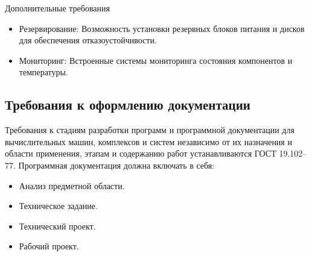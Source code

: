 Дополнительные требования
\begin{itemize}
	\item Резервирование: Возможность установки резервных блоков питания и дисков для обеспечения отказоустойчивости.
	\item Мониторинг: Встроенные системы мониторинга состояния компонентов и температуры.
\end{itemize}

\subsection{Требования к оформлению документации}
Требования к стадиям разработки программ и программной документации для вычислительных машин, комплексов и систем независимо от их
назначения и области применения, этапам и содержанию работ устанавливаются ГОСТ 19.102–77.
Программная документация должна включать в себя:
\begin{itemize}
\item Анализ предметной области.
\item Техническое задание.
\item Технический проект.
\item Рабочий проект.
\end{itemize}